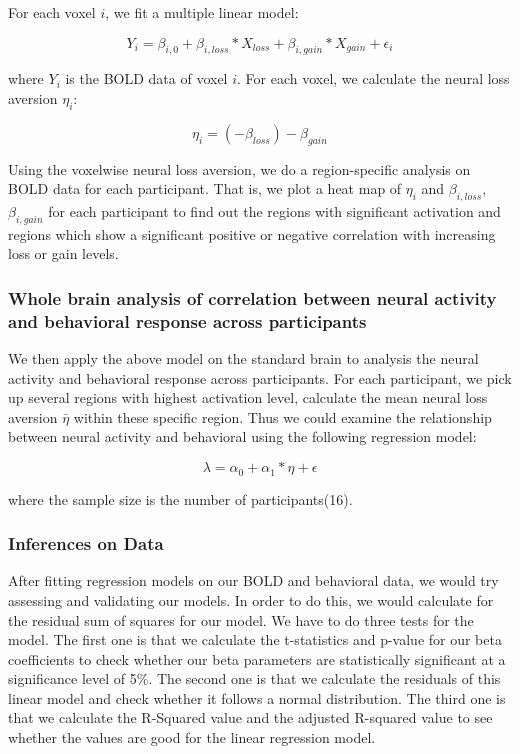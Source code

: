 For each voxel $i$, we fit a multiple linear model:

\begin{equation}
Y_{i} = \beta_{i, 0} + \beta_{i, loss} *X_{loss} + \beta_{i, gain} * X_{gain}  + 
\epsilon_i
\end{equation}

where $Y_{i}$ is the BOLD data of voxel $i$. For each voxel, we calculate the 
neural loss aversion $\eta_i$:

\begin{equation}
\eta_i = (-\beta_{loss}) - \beta_{gain}
\end{equation}

Using the voxelwise neural loss aversion, we do a region-specific analysis on 
BOLD data for each participant. That is, we plot a heat map of $\eta_i$ and  
$\beta_{i, loss}$, $ \beta_{i, gain}$ for each participant to find out the 
regions with significant activation and regions which show a significant 
positive or negative correlation with increasing loss or gain levels.

\subsubsection{Whole brain analysis of correlation between 
neural activity and behavioral response across participants}

We then apply the above model on the standard brain to analysis the neural 
activity and behavioral response across participants. For each participant, 
we pick up several regions with highest activation level, calculate the mean 
neural loss aversion $\bar{\eta}$ within these specific region. Thus we could 
examine the relationship between neural activity and behavioral using the 
following regression model:

\begin{equation}
\lambda = \alpha_0 + \alpha_1 * \eta + \epsilon
\end{equation}

where the sample size is the number of participants(16).

\subsubsection{Inferences on Data}

After fitting regression models on our BOLD and behavioral data, we would try 
assessing and validating our models. In order to do this, we would calculate 
for the residual sum of squares for our model. We have to do three tests for 
the model. The first one is that we calculate the t-statistics and p-value for 
our beta coefficients to check whether our beta parameters are statistically 
significant at a significance level of 5\%. The second one is that we calculate
the residuals of this linear model and check whether it follows a normal 
distribution. The third one is that we calculate the R-Squared value and the 
adjusted R-squared value to see whether the values are good for the linear 
regression model.


